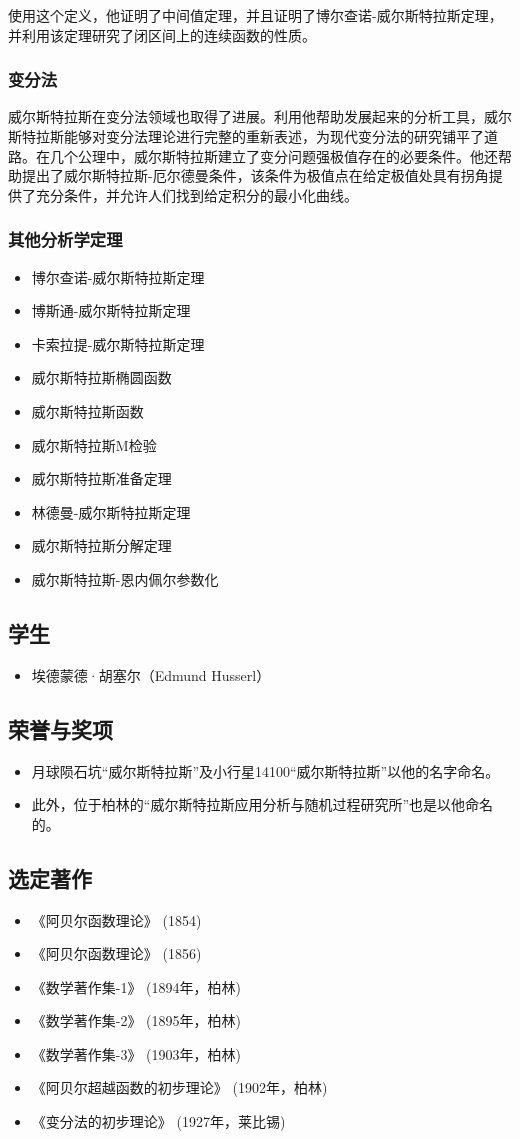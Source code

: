 使用这个定义，他证明了中间值定理，并且证明了博尔查诺-威尔斯特拉斯定理，并利用该定理研究了闭区间上的连续函数的性质。
\subsubsection{变分法}
威尔斯特拉斯在变分法领域也取得了进展。利用他帮助发展起来的分析工具，威尔斯特拉斯能够对变分法理论进行完整的重新表述，为现代变分法的研究铺平了道路。在几个公理中，威尔斯特拉斯建立了变分问题强极值存在的必要条件。他还帮助提出了威尔斯特拉斯-厄尔德曼条件，该条件为极值点在给定极值处具有拐角提供了充分条件，并允许人们找到给定积分的最小化曲线。
\subsubsection{其他分析学定理} 
\begin{itemize}
\item 博尔查诺-威尔斯特拉斯定理  
\item 博斯通-威尔斯特拉斯定理  
\item 卡索拉提-威尔斯特拉斯定理  
\item 威尔斯特拉斯椭圆函数  
\item 威尔斯特拉斯函数  
\item 威尔斯特拉斯M检验  
\item 威尔斯特拉斯准备定理  
\item 林德曼-威尔斯特拉斯定理  
\item 威尔斯特拉斯分解定理  
\item 威尔斯特拉斯-恩内佩尔参数化
\end{itemize}
\subsection{学生}  
\begin{itemize}
\item 埃德蒙德·胡塞尔（Edmund Husserl）
\end{itemize}
\subsection{荣誉与奖项}  
\begin{itemize}
\item 月球陨石坑“威尔斯特拉斯”及小行星14100“威尔斯特拉斯”以他的名字命名。  
\item 此外，位于柏林的“威尔斯特拉斯应用分析与随机过程研究所”也是以他命名的。
\end{itemize}
\subsection{选定著作}  
\begin{itemize}
\item 《阿贝尔函数理论》 (1854)  
\item 《阿贝尔函数理论》 (1856)  
\item 《数学著作集-1》 (1894年，柏林)  
\item 《数学著作集-2》 (1895年，柏林)  
\item 《数学著作集-3》 (1903年，柏林)  
\item 《阿贝尔超越函数的初步理论》 (1902年，柏林)  
\item 《变分法的初步理论》 (1927年，莱比锡)
\end{itemize}

